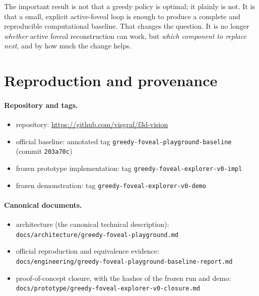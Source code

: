 \documentclass[11pt,a4paper]{article}
\newcommand{\code}[1]{\texttt{\small #1}}
\begin{document}
The important result is not that a greedy policy is optimal; it plainly is not. It is that a small, explicit
active-foveal loop is enough to produce a complete and reproducible computational baseline. That changes the question.
It is no longer \emph{whether} active foveal reconstruction can work, but \emph{which component to replace next}, and
by how much the change helps.




\appendix
\section{Reproduction and provenance}\label{app:provenance}

\paragraph{Repository and tags.}
\begin{itemize}
  \item repository: \url{https://github.com/visgraf/f3d-vision}
  \item official baseline: annotated tag \code{greedy-foveal-playground-baseline} (commit \code{203a70c})
  \item frozen prototype implementation: tag \code{greedy-foveal-explorer-v0-impl}
  \item frozen demonstration: tag \code{greedy-foveal-explorer-v0-demo}
\end{itemize}

\paragraph{Canonical documents.}
\begin{itemize}
  \item architecture (the canonical technical description):\\ \code{docs/architecture/greedy-foveal-playground.md}
  \item official reproduction and equivalence evidence:\\
        \code{docs/engineering/greedy-foveal-playground-baseline-report.md}
  \item proof-of-concept closure, with the hashes of the frozen run and demo:\\
        \code{docs/prototype/greedy-foveal-explorer-v0-closure.md}
\end{itemize}
\end{document}
